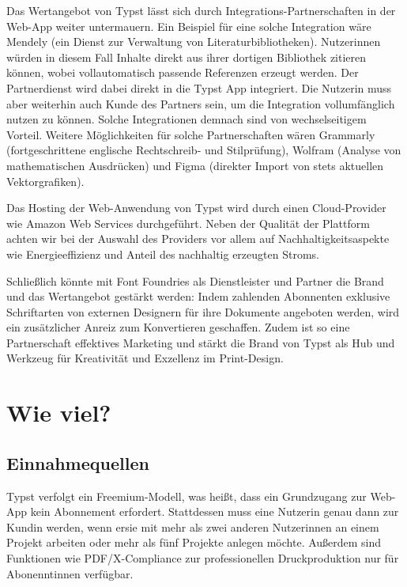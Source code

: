 \documentclass[11pt, a4paper]{article}
\newcommand{\gender}{\raisebox{-.25em}{*}}
\let\oldsection\section
\renewcommand\section{\clearpage\oldsection}
\renewcommand{\glossary} {\marginsymbol{\textbf{↪}}}
\newcommand{\marginsymbol}[1] {\protect\marginsymbolhelper{#1}}
\newcommand{\marginsymbolhelper}[1] {\tabto*{-1cm}\makebox[0cm]{#1}\tabto*{\TabPrevPos}}
\begin{document}
Das Wertangebot von Typst lässt sich durch Integrations-Partnerschaften in der Web-App weiter untermauern. Ein Beispiel für eine solche Integration wäre Mendely (ein Dienst zur Verwaltung von Literaturbibliotheken). Nutzer\gender{}innen würden in diesem Fall Inhalte direkt aus ihrer dortigen Bibliothek zitieren können, wobei vollautomatisch passende Referenzen erzeugt werden. Der Partnerdienst wird dabei direkt in die Typst App integriert. Die\gender{} Nutzer\gender{}in muss aber weiterhin auch Kunde des Partners sein, um die Integration vollumfänglich nutzen zu können. Solche Integrationen demnach sind von wechselseitigem Vorteil. Weitere Möglichkeiten für solche Partnerschaften wären Grammarly (fortgeschrittene englische Rechtschreib- und Stilprüfung), Wolfram (Analyse von mathematischen Ausdrücken) und Figma (direkter Import von stets aktuellen Vektorgrafiken).

Das Hosting der Web-Anwendung von Typst wird durch einen Cloud-Provider wie Amazon Web Services durchgeführt. Neben der Qualität der Plattform achten wir bei der Auswahl des Providers vor allem auf Nachhaltigkeitsaspekte wie Energieeffizienz und Anteil des nachhaltig erzeugten Stroms.

Schließlich könnte mit Font Foundries als Dienstleister und Partner die Brand und das Wertangebot gestärkt werden: Indem zahlenden Abonnenten exklusive Schriftarten von externen Designern für ihre Dokumente angeboten werden, wird ein zusätzlicher Anreiz zum Konvertieren geschaffen. Zudem ist so eine Partnerschaft effektives Marketing und stärkt die Brand von Typst als Hub und Werkzeug für Kreativität und Exzellenz im Print-Design.

\section*{Wie viel?}
\subsection*{Einnahmequellen}


Typst verfolgt ein Freemium-Modell, was heißt, dass ein Grundzugang zur Web-App kein Abonnement erfordert. Stattdessen muss ein\gender{}e Nutzer\gender{}in genau dann zur Kund\gender{}in werden, wenn er\gender{}sie mit mehr als zwei anderen Nutzer\gender{}innen an einem Projekt arbeiten oder mehr als fünf Projekte anlegen möchte. Außerdem sind Funktionen wie \glossary PDF/X-Compliance zur professionellen Druckproduktion nur für Abonennt\gender{}innen verfügbar.
\end{document}
